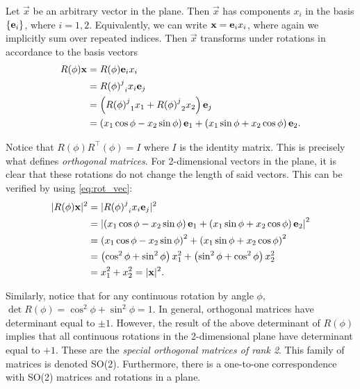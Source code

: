 Let $\vec{x}$ be an arbitrary vector in the plane. Then $\vec{x}$ has components $x_i$ in the basis $\{\mathbf{e}_i\}$, where $i=1,2$. Equivalently, we can write $\mathbf{x}=\mathbf{e}_i x_i$, where again we implicitly sum over repeated indices. Then $\vec{x}$ transforms under rotations in accordance to the basis vectors
\begin{align}
    R(\phi)\mathbf{x} &= R(\phi)\mathbf{e}_i x_i \nonumber \\
    &= {{R(\phi)}^j}_i x_i \mathbf{e}_j \nonumber \\
    &= \left( {{R(\phi)}^j}_1x_1 + {{R(\phi)}^j}_2x_2 \right) \mathbf{e}_j \nonumber \\
    &= \left( x_1\cos\phi - x_2\sin\phi \right)\mathbf{e}_1 + \left( x_1\sin\phi + x_2\cos\phi \right)\mathbf{e}_2. \label{eq:rot_vec} 
\end{align}

Notice that $R(\phi)R^\top(\phi) = I$ where $I$ is the identity matrix. This is precisely what defines \textit{orthogonal matrices}. For 2-dimensional vectors in the plane, it is clear that these rotations do not change the length of said vectors. This can be verified by using \cref{eq:rot_vec}:
\begin{align*}
    |R(\phi)\mathbf{x}|^2 &= |{{R(\phi)}^j}_i x_i\mathbf{e}_j|^2 \\
    &= \left|\left( x_1\cos\phi - x_2\sin\phi \right)\mathbf{e}_1 + \left( x_1\sin\phi + x_2\cos\phi \right)\mathbf{e}_2\right|^2 \\
    &= {\left( x_1\cos\phi - x_2\sin\phi \right)}^2 + {\left( x_1\sin\phi + x_2\cos\phi \right)}^2 \\
    &= \left( \cos^2\phi + \sin^2\phi \right)x_1^2 + \left( \sin^2\phi + \cos^2\phi \right)x_2^2 \\
    &= x_1^2 + x_2^2 = |\mathbf{x}|^2.
\end{align*}

Similarly, notice that for any continuous rotation by angle $\phi$, $\det R(\phi) = \cos^2\phi+\sin^2\phi = 1$. In general, orthogonal matrices have determinant equal to $\pm1$. However, the result of the above determinant of $R(\phi)$ implies that all continuous rotations in the 2-dimensional plane have determinant equal to $+1$. These are the \textit{special orthogonal matrices of rank 2}. This family of matrices is denoted SO(2). Furthermore, there is a one-to-one correspondence with SO(2) matrices and rotations in a plane.

